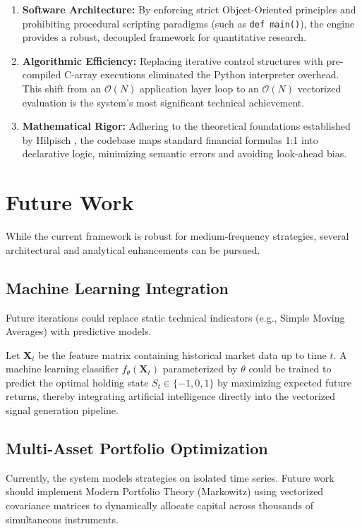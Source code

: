 \begin{enumerate}
    \item \textbf{Software Architecture:} By enforcing strict Object-Oriented principles and prohibiting procedural scripting paradigms (such as \texttt{def main()}), the engine provides a robust, decoupled framework for quantitative research.
    \item \textbf{Algorithmic Efficiency:} Replacing iterative control structures with pre-compiled C-array executions eliminated the Python interpreter overhead. This shift from an $\mathcal{O}(N)$ application layer loop to an $\mathcal{O}(N)$ vectorized evaluation is the system's most significant technical achievement.
    \item \textbf{Mathematical Rigor:} Adhering to the theoretical foundations established by Hilpisch \cite{hilpisch2018}, the codebase maps standard financial formulas 1:1 into declarative logic, minimizing semantic errors and avoiding look-ahead bias.
\end{enumerate}

\section{Future Work}

While the current framework is robust for medium-frequency strategies, several architectural and analytical enhancements can be pursued.

\subsection{Machine Learning Integration}
Future iterations could replace static technical indicators (e.g., Simple Moving Averages) with predictive models.

\begin{remark}
Let $\mathbf{X}_t$ be the feature matrix containing historical market data up to time $t$. A machine learning classifier $f_\theta(\mathbf{X}_t)$ parameterized by $\theta$ could be trained to predict the optimal holding state $S_t \in \{-1, 0, 1\}$ by maximizing expected future returns, thereby integrating artificial intelligence directly into the vectorized signal generation pipeline.
\end{remark}

\subsection{Multi-Asset Portfolio Optimization}
Currently, the system models strategies on isolated time series. Future work should implement Modern Portfolio Theory (Markowitz) using vectorized covariance matrices to dynamically allocate capital across thousands of simultaneous instruments.

